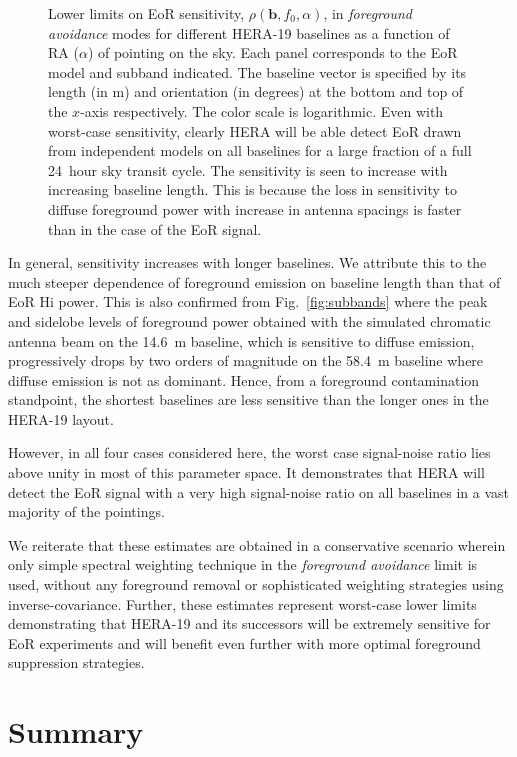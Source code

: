 \documentclass[preprint2,iop,numberedappendix,twocolappendix,appendixfloats]{emulateapj}
\begin{document}
\begin{figure}[htb]
\caption{Lower limits on EoR sensitivity, $\rho(\boldsymbol{b},f_0,\alpha)$, in {\it foreground avoidance} modes for different HERA-19 baselines as a function of RA ($\alpha$) of pointing on the sky. Each panel corresponds to the EoR model and subband indicated. The baseline vector is specified by its length (in m) and orientation (in degrees) at the bottom and top of the $x$-axis respectively. The color scale is logarithmic. Even with worst-case sensitivity, clearly HERA will be able detect EoR drawn from independent models on all baselines for a large fraction of a full 24~hour sky transit cycle. The sensitivity is seen to increase with increasing baseline length. This is because the loss in sensitivity to diffuse foreground power with increase in antenna spacings is faster than in the case of the EoR signal.}
\label{fig:eor-fg-ratios}
\end{figure}

In general, sensitivity increases with longer baselines. We attribute this to the much steeper dependence of foreground emission on baseline length than that of EoR H{\sc i} power. This is also confirmed from Fig.~\ref{fig:subbands} where the peak and sidelobe levels of foreground power obtained with the simulated chromatic antenna beam on the 14.6~m baseline, which is sensitive to diffuse emission, progressively drops by two orders of magnitude on the 58.4~m baseline where diffuse emission is not as dominant. Hence, from a foreground contamination standpoint, the shortest baselines are less sensitive than the longer ones in the HERA-19 layout.

However, in all four cases considered here, the worst case signal-noise ratio lies above unity in most of this parameter space. It demonstrates that HERA will detect the EoR signal with a very high signal-noise ratio on all baselines in a vast majority of the pointings. 

We reiterate that these estimates are obtained in a conservative scenario wherein only simple spectral weighting technique in the {\it foreground avoidance} limit is used, without any foreground removal or sophisticated weighting strategies using inverse-covariance. Further, these estimates represent worst-case lower limits demonstrating that HERA-19 and its successors will be extremely sensitive for EoR experiments and will benefit even further with more optimal foreground suppression strategies.

\section{Summary}\label{sec:summary}
\end{document}
